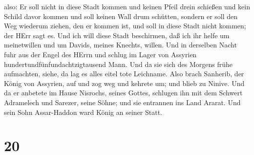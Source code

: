 also: Er soll nicht in diese Stadt kommen und keinen Pfeil drein
schießen und kein Schild davor kommen und soll keinen Wall drum
schütten,  sondern er soll den Weg wiederum ziehen, den er
kommen ist, und soll in diese Stadt nicht kommen; der HErr sagt es.
 Und ich will diese Stadt beschirmen, daß ich ihr helfe um
meinetwillen und um Davids, meines Knechts, willen.  Und in
derselben Nacht fuhr aus der Engel des HErrn und schlug im Lager von
Assyrien hundertundfünfundachtzigtausend Mann. Und da sie sich des
Morgens frühe aufmachten, siehe, da lag es alles eitel tote Leichname.
 Also brach Sanherib, der König von Assyrien, auf und zog
weg und kehrete um; und blieb zu Ninive.  Und da er
anbetete im Hause Nisrochs, seines Gottes, schlugen ihn mit dem Schwert
Adramelech und Sarezer, seine Söhne; und sie entrannen ins Land Ararat.
Und sein Sohn Assar-Haddon ward König an seiner Statt.

\hypertarget{section-19}{%
\section{20}\label{section-19}}

